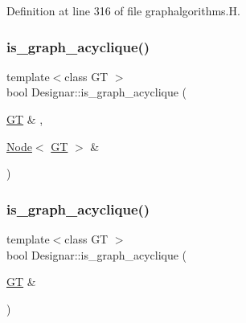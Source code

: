 Definition at line 316 of file graphalgorithms.\+H.

\mbox{\label{namespace_designar_a745761588a29956929fda0d246ebbef5}} 
\subsubsection{\texorpdfstring{is\+\_\+graph\+\_\+acyclique()}{is\_graph\_acyclique()}\hspace{0.1cm}{\footnotesize\ttfamily [1/2]}}
{\footnotesize\ttfamily template$<$class GT $>$ \\
bool Designar\+::is\+\_\+graph\+\_\+acyclique (\begin{DoxyParamCaption}\item[{\hyperlink{demo-buildgraph_8_c_a3001c40d2c31ca87ed96cd7d1334a55e}{GT} \&}]{,  }\item[{\hyperlink{namespace_designar_a5af326c65aa2bd26b26c410f2030d09e}{Node}$<$ \hyperlink{demo-buildgraph_8_c_a3001c40d2c31ca87ed96cd7d1334a55e}{GT} $>$ \&}]{ }\end{DoxyParamCaption})}

\mbox{\label{namespace_designar_a2cf5f0717993e7d2a4dbc26ff8380a72}} 
\subsubsection{\texorpdfstring{is\+\_\+graph\+\_\+acyclique()}{is\_graph\_acyclique()}\hspace{0.1cm}{\footnotesize\ttfamily [2/2]}}
{\footnotesize\ttfamily template$<$class GT $>$ \\
bool Designar\+::is\+\_\+graph\+\_\+acyclique (\begin{DoxyParamCaption}\item[{\hyperlink{demo-buildgraph_8_c_a3001c40d2c31ca87ed96cd7d1334a55e}{GT} \&}]{ }\end{DoxyParamCaption})}

\mbox{\label{namespace_designar_aa57796582cb83d7459c43044ebf15f80}} 
